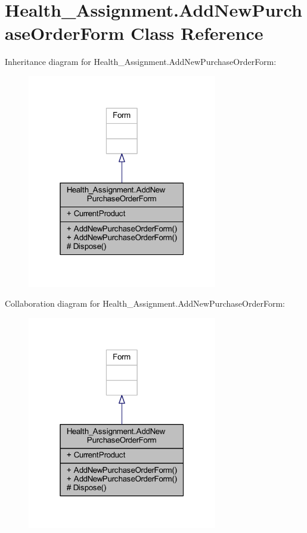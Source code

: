 \hypertarget{class_health___assignment_1_1_add_new_purchase_order_form}{}\section{Health\+\_\+\+Assignment.\+Add\+New\+Purchase\+Order\+Form Class Reference}
\label{class_health___assignment_1_1_add_new_purchase_order_form}


Inheritance diagram for Health\+\_\+\+Assignment.\+Add\+New\+Purchase\+Order\+Form\+:\nopagebreak
\begin{figure}[H]
\begin{center}
\leavevmode
\includegraphics[width=235pt]{class_health___assignment_1_1_add_new_purchase_order_form__inherit__graph}
\end{center}
\end{figure}


Collaboration diagram for Health\+\_\+\+Assignment.\+Add\+New\+Purchase\+Order\+Form\+:\nopagebreak
\begin{figure}[H]
\begin{center}
\leavevmode
\includegraphics[width=235pt]{class_health___assignment_1_1_add_new_purchase_order_form__coll__graph}
\end{center}
\end{figure}
